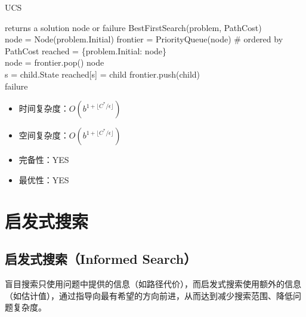 \begin{algorithm}[H]
    \caption{UCS}
    \begin{algorithmic}[1]
         returns a solution node or failure
        \State \Return BestFirstSearch(problem, PathCost)
        \EndProcedure
        \\
        \State node = Node(problem.Initial)
        \State frontier = PriorityQueue(node)   \# ordered by PathCost
        \State reached = \{problem.Initial: node\}
        \\
        \State node = frontier.pop()
        \State \Return node
        \EndIf
        \\
        \State s = child.State
        \State reached[s] = child
        \State frontier.push(child)
        \EndIf
        \EndFor
        \EndWhile
        \\
        \State \Return failure
        \EndProcedure
    \end{algorithmic}
\end{algorithm}

\begin{itemize}
    \item 时间复杂度：$ O(b^{1 + \lfloor C^* / \epsilon \rfloor}) $
    \item 空间复杂度：$ O(b^{1 + \lfloor C^* / \epsilon \rfloor}) $
    \item 完备性：YES
    \item 最优性：YES
\end{itemize}

\newpage

\section{启发式搜索}

\subsection{启发式搜索（Informed Search）}

盲目搜索只使用问题中提供的信息（如路径代价），而启发式搜索使用额外的信息（如估计值），通过指导向最有希望的方向前进，从而达到减少搜索范围、降低问题复杂度。\\

